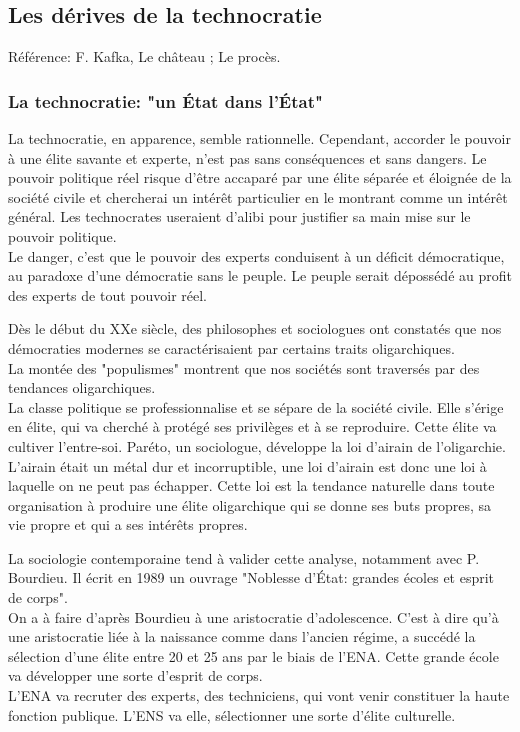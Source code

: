 \documentclass[10pt, a4paper, openany]{book}
\begin{document}
\subsection{Les dérives de la technocratie}

Référence: F. Kafka, Le château ; Le procès. 

\subsubsection{La technocratie: "un État dans l'État"}

La technocratie, en apparence, semble rationnelle. Cependant, accorder le pouvoir à une élite savante et experte, n'est pas sans conséquences et sans dangers. Le pouvoir politique réel risque d'être accaparé par une élite séparée et éloignée de la société civile et chercherai un intérêt particulier en le montrant comme un intérêt général. Les technocrates useraient d'alibi pour justifier sa main mise sur le pouvoir politique. \\
Le danger, c'est que le pouvoir des experts conduisent à un déficit démocratique, au paradoxe d'une démocratie sans le peuple. Le peuple serait dépossédé au profit des experts de tout pouvoir réel.


Dès le début du XXe siècle, des philosophes et sociologues ont constatés que nos démocraties modernes se caractérisaient par certains traits oligarchiques. \\
La montée des "populismes" montrent que nos sociétés sont traversés par des tendances oligarchiques. \\
La classe politique se professionnalise et se sépare de la société civile. Elle s'érige en élite, qui va cherché à protégé ses privilèges et à se reproduire. Cette élite va cultiver l'entre-soi. Paréto, un sociologue, développe la loi d'airain de l'oligarchie. L'airain était un métal dur et incorruptible, une loi d'airain est donc une loi à laquelle on ne peut pas échapper. Cette loi est la tendance naturelle dans toute organisation à produire une élite oligarchique qui se donne ses buts propres, sa vie propre et qui a ses intérêts propres.


La sociologie contemporaine tend à valider cette analyse, notamment avec P. Bourdieu. Il écrit en 1989 un ouvrage "Noblesse d'État: grandes écoles et esprit de corps". \\
On a à faire d'après Bourdieu à une aristocratie d'adolescence. C'est à dire qu'à une aristocratie liée à la naissance comme dans l'ancien régime, a succédé la sélection d'une élite entre 20 et 25 ans par le biais de l'ENA. Cette grande école va développer une sorte d'esprit de corps. \\
L'ENA va recruter des experts, des techniciens, qui vont venir constituer la haute fonction publique. L'ENS va elle, sélectionner une sorte d'élite culturelle. 
\end{document}
